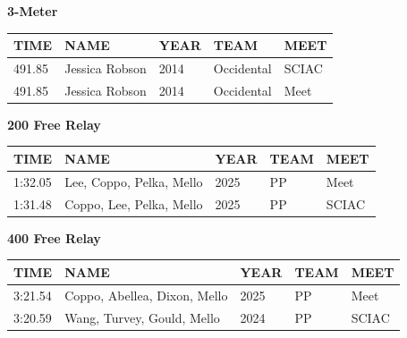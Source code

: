 \begin{table}[H]
\centering
\begin{minipage}[t]{0.6\textwidth}
\centering
\textbf{3-Meter}\\[0.1cm]
\begin{tabular}{@{}p{1.8cm}p{2.8cm}p{1.2cm}p{1.4cm}p{1.4cm}@{}}
\hline
    \textbf{TIME} & \textbf{NAME} & \textbf{YEAR} & \textbf{TEAM} & \textbf{MEET} \\
\hline
    491.85 & Jessica Robson & 2014 & Occidental & SCIAC \\
    491.85 & Jessica Robson & 2014 & Occidental & Meet \\
\hline
\end{tabular}
\end{minipage}
\end{table}

\begin{table}[H]
\centering
\begin{minipage}[t]{0.6\textwidth}
\centering
\textbf{200 Free Relay}\\[0.1cm]
\begin{tabular}{@{}p{1.8cm}p{2.8cm}p{1.2cm}p{1.4cm}p{1.4cm}@{}}
\hline
    \textbf{TIME} & \textbf{NAME} & \textbf{YEAR} & \textbf{TEAM} & \textbf{MEET} \\
\hline
    1:32.05 & Lee, Coppo, Pelka, Mello & 2025 & PP & Meet \\
    1:31.48 & Coppo, Lee, Pelka, Mello & 2025 & PP & SCIAC \\
\hline
\end{tabular}
\end{minipage}
\end{table}

\begin{table}[H]
\centering
\begin{minipage}[t]{0.6\textwidth}
\centering
\textbf{400 Free Relay}\\[0.1cm]
\begin{tabular}{@{}p{1.8cm}p{2.8cm}p{1.2cm}p{1.4cm}p{1.4cm}@{}}
\hline
    \textbf{TIME} & \textbf{NAME} & \textbf{YEAR} & \textbf{TEAM} & \textbf{MEET} \\
\hline
    3:21.54 & Coppo, Abellea, Dixon, Mello & 2025 & PP & Meet \\
    3:20.59 & Wang, Turvey, Gould, Mello & 2024 & PP & SCIAC \\
\hline
\end{tabular}
\end{minipage}
\end{table}


